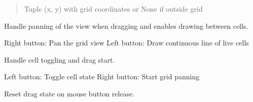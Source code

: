 \documentclass[letterpaper,10pt,oneside,english]{sphinxhowto}
\begin{document}
\begin{fulllineitems}
\begin{fulllineitems}
\begin{quote}
\begin{description}
\sphinxAtStartPar
Tuple (x, y) with grid coordinates or None if outside grid

\end{description}\end{quote}

\end{fulllineitems}


\begin{fulllineitems}
\label{\detokenize{gui:gui.game_modules.grid_canvas.GridCanvas.mouseMoveEvent}}
\pysigstartsignatures
\pysiglinewithargsret
{}
{}
{}
\pysigstopsignatures
\sphinxAtStartPar
Handle panning of the view when dragging and enables drawing between cells.

\sphinxAtStartPar
Right button: Pan the grid view
Left button: Draw continuous line of live cells

\end{fulllineitems}


\begin{fulllineitems}
\label{\detokenize{gui:gui.game_modules.grid_canvas.GridCanvas.mousePressEvent}}
\pysigstartsignatures
\pysiglinewithargsret
{}
{}
{}
\pysigstopsignatures
\sphinxAtStartPar
Handle cell toggling and drag start.

\sphinxAtStartPar
Left button: Toggle cell state
Right button: Start grid panning

\end{fulllineitems}


\begin{fulllineitems}
\label{\detokenize{gui:gui.game_modules.grid_canvas.GridCanvas.mouseReleaseEvent}}
\pysigstartsignatures
\pysiglinewithargsret
{}
{}
{}
\pysigstopsignatures
\sphinxAtStartPar
Reset drag state on mouse button release.


\end{fulllineitems}
\end{fulllineitems}
\end{document}
